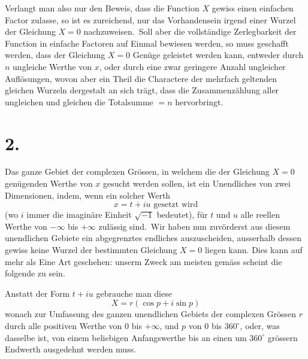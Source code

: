 \documentclass[12pt,a4paper]{article}
\theoremstyle{plain}
\begin{document}
Verlangt man also nur den Beweis, dass die Function $X$ gewiss einen einfachen Factor zulasse, so ist es zureichend, nur das Vorhandensein irgend einer
Wurzel der Gleichung $X = 0$ nachzuweisen.\ Soll aber die vollständige Zerlegbarkeit der Function in einfache Factoren auf Einmal bewiesen werden, so muss
geschafft werden, dass der Gleichung $X = 0$ Genüge geleistet werden kann, entweder durch $n$ ungleiche Werthe von $x$, oder durch eine zwar geringere Anzahl
ungleicher Auflösungen, wovon aber ein Theil die Charactere der mehrfach geltenden gleichen Wurzeln dergestalt an sich trägt, dass die Zusammenzählung aller ungleichen und gleichen die Totalsumme $= n$ hervorbringt.

\section*{2.}

Das ganze Gebiet der complexen Grössen, in welchem die der Gleichung
$X = 0$ genügenden Werthe von $x$ gesucht werden sollen, ist ein Unendliches
von zwei Dimensionen, indem, wenn ein solcher Werth
\[
x = t + iu \text{ gesetzt wird}
\]
(wo $i$ immer die imaginäre Einheit $\sqrt{-1}$ bedeutet), für $t$ und $u$ alle reellen
Werthe von $-\infty$ bis $+\infty$ zulässig sind.\ Wir haben nun zuvörderst aus diesem unendlichen Gebiete ein abgegrenztes endliches auszuscheiden, ausserhalb
dessen gewiss keine Wurzel der bestimmten Gleichung $X = 0$ liegen kann.
Dies kann auf mehr als Eine Art geschehen: unserm Zweck am meisten gemäss
scheint die folgende zu sein.

Anstatt der Form $t + iu$ gebrauche man diese
\[
X = r(\cos p + i \sin p)
\]
wonach zur Umfassung des ganzen unendlichen Gebiets der complexen Grössen
$r$ durch alle positiven Werthe von $0$ bis $+\infty$, und $p$ von $0$ bis $360^\circ$, oder, was
dasselbe ist, von einem beliebigen Anfangswerthe bis an einen um $360^\circ$ grössern
Endwerth ausgedehnt werden muss.
\end{document}
